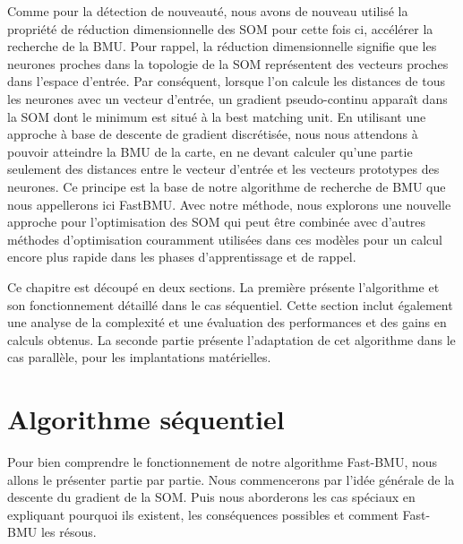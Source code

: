 	Comme pour la détection de nouveauté, nous avons de nouveau utilisé la propriété de réduction dimensionnelle des SOM pour cette fois ci, accélérer la recherche de la BMU. Pour rappel, la réduction dimensionnelle signifie que les neurones proches dans la topologie de la SOM représentent des vecteurs proches dans l'espace d'entrée. Par conséquent, lorsque l'on calcule les distances de tous les neurones avec un vecteur d'entrée, un gradient pseudo-continu apparaît dans la SOM dont le minimum est situé à la best matching unit. En utilisant une approche à base de descente de gradient discrétisée, nous nous attendons à pouvoir atteindre la BMU de la carte, en ne devant calculer qu'une partie seulement des distances entre le vecteur d'entrée et les vecteurs prototypes des neurones. Ce principe est la base de notre algorithme de recherche de BMU que nous appellerons ici FastBMU. Avec notre méthode, nous explorons une nouvelle approche pour l'optimisation des SOM qui peut être combinée avec d'autres méthodes d'optimisation couramment utilisées dans ces modèles pour un calcul encore plus rapide dans les phases d'apprentissage et de rappel.

	Ce chapitre est découpé en deux sections. La première présente l'algorithme et son fonctionnement détaillé dans le cas séquentiel. Cette section inclut également une analyse de la complexité et une évaluation des performances et des gains en calculs obtenus. La seconde partie présente l'adaptation de cet algorithme dans le cas parallèle, pour les implantations matérielles.

	\newpage

	\section{Algorithme séquentiel}

	Pour bien comprendre le fonctionnement de notre algorithme Fast-BMU, nous allons le présenter partie par partie. Nous commencerons par l'idée générale de la descente du gradient de la SOM. Puis nous aborderons les cas spéciaux en expliquant pourquoi ils existent, les conséquences possibles et comment Fast-BMU les résous.

